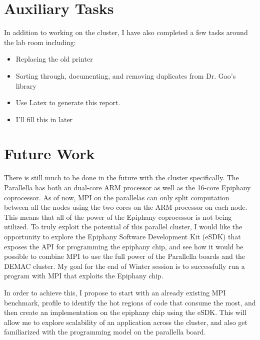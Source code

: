 \documentclass[letterpaper,12pt]{article}
\begin{document}
\section{Auxiliary Tasks}
In addition to working on the cluster, I have also completed a few tasks around the lab room including:
\begin{itemize}
\item Replacing the old printer
\item Sorting through, documenting, and removing duplicates from Dr. Gao's library
\item Use Latex to generate this report.
\item {\color{red}I'll fill this in later}
\end{itemize}

\section{Future Work}

    There is still much to be done in the future with the cluster specifically. The Parallella has both an dual-core ARM processor as well as the 16-core Epiphany coprocessor. As of now, MPI on the parallelas can only split computation between all the nodes using the two cores on the ARM processor on each node. This means that all of the power of the Epiphany coprocessor is not being utilized. To truly exploit the potential of this parallel cluster, I would like the opportunity to explore the Epiphany Software Development Kit (eSDK) that exposes the API for programming the epiphany chip, and see how it would be possible to combine MPI to use the full power of the Parallella boards and the DEMAC cluster. My goal for the end of Winter session is to successfully run a program with MPI that exploits the Epiphany chip.

In order to achieve this, I propose to start with an already existing MPI benchmark, profile to identify the hot regions of code that consume the most, and then create an implementation on the epiphany chip using the eSDK. This will allow me to explore scalability of an application across the cluster, and also get familiarized with the programming model on the parallella board.



\end{document}
